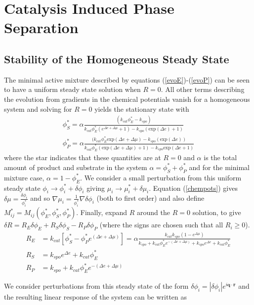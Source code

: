 \section{Catalysis Induced Phase Separation}
\subsection{Stability of the Homogeneous Steady State}
The minimal active mixture described by equations (\ref{evoE})-(\ref{evoP}) can be seen to have a uniform steady state solution when $R=0$. All other terms describing the evolution from gradients in the chemical potentials vanish for a homogeneous system and solving for $R=0$ yields the stationary state with
\begin{align}
    \phi_S^* = \alpha\frac{(k_{cat}\phi_E^*-k_{spo})}{k_{cat}\phi_E^*(e^{\Delta e + \Delta\mu}+1) - k_{spo}(\text{exp} (\Delta e)+1)} \label{sstar}
    \\
    \phi_P^* = \alpha\frac{(k_{cat}\phi_E^*\text{exp} (\Delta e + \Delta\mu) - k_{spo}(\text{exp} (\Delta e))}{k_{cat}\phi_E^*(\text{exp} (\Delta e + \Delta\mu)+1) - k_{spo}\text{exp} (\Delta e+1)} 
    \label{pstar}
\end{align}
where the star indicates that these quantities are at $R=0$ and $\alpha$ is the total amount of product and substrate in the system $\alpha = \phi_S^*+\phi_P^*$ and for the minimal mixture case, $\alpha = 1-\phi_E^*$. We consider a small perturbation from this uniform steady state $\phi_i \rightarrow \phi_i^* + \delta\phi_i$ giving $\mu_i \rightarrow \mu_i^* + \delta\mu_i$. Equation (\ref{chempots}) gives $\delta\mu = \frac{\delta\phi_i}{\phi_i^*}$ and so $\nabla\mu_i = \frac{1}{\phi_i^*}\nabla\delta\phi_i$ (both to first order) and also define $M^*_{ij} = M_{ij}(\phi_E^*, \phi_S^*, \phi_P^*)$. Finally, expand $R$ around the $R=0$ solution, to give $\delta R = R_E\delta\phi_E+R_S\delta\phi_S-R_P\delta\phi_P$ (where the signs are chosen such that all $R_i \geq 0$).
\begin{align}
    R_E &= k_{cat}[\phi_S^*-\phi_P^*e^{(\Delta e + \Delta \mu)}] = \alpha\frac{k_{cat}k_{spo}(1-e^{\Delta \mu})}{k_{spo}+k_{cat}\phi_E^*e^{-(\Delta e + \Delta \mu)}+k_{spo}e^{\Delta e}+k_{cat}\phi_E^*}\\
    R_S &= k_{spo}e^{\Delta e} + k_{cat}\phi_E^*\\
    R_P &= k_{spo} + k_{cat}\phi_E^*e^{-(\Delta e+\Delta \mu)}
\end{align}

We consider perturbations from this steady state of the form $\delta\phi_i = |\delta\phi_i| e^{i\textbf{q}\cdot\textbf{r}}$ and the resulting linear response of the system can be written as

